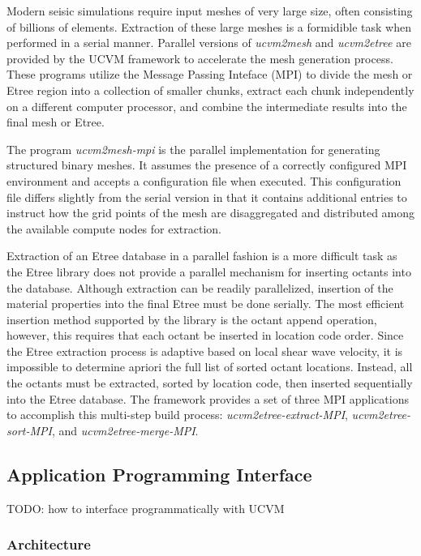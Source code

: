 Modern seisic simulations require input meshes of very large size, often consisting of billions of elements. Extraction of these large meshes is a formidible task when performed in a serial manner. Parallel versions of \emph{ucvm2mesh} and \emph{ucvm2etree} are provided by the UCVM framework to accelerate the mesh generation process. These programs utilize the Message Passing Inteface (MPI) to divide the mesh or Etree region into a collection of smaller chunks, extract each chunk independently on a different computer processor, and combine the intermediate results into the final mesh or Etree.

The program \emph{ucvm2mesh-mpi} is the parallel implementation for generating structured binary meshes. It assumes the presence of a correctly configured MPI environment and accepts a configuration file when executed. This configuration file differs slightly from the serial version in that it contains additional entries to instruct how the grid points of the mesh are disaggregated and distributed among the available compute nodes for extraction.

Extraction of an Etree database in a parallel fashion is a more difficult task as the Etree library does not provide a parallel mechanism for inserting octants into the database. Although extraction can be readily parallelized, insertion of the material properties into the final Etree must be done serially. The most efficient insertion method supported by the library is the octant append operation, however, this requires that each octant be inserted in location code order. Since the Etree extraction process is adaptive based on local shear wave velocity, it is impossible to determine apriori the full list of sorted octant locations. Instead, all the octants must be extracted, sorted by location code, then inserted sequentially into the Etree database. The framework provides a set of three MPI applications to accomplish this multi-step build process: \emph{ucvm2etree-extract-MPI}, \emph{ucvm2etree-sort-MPI}, and \emph{ucvm2etree-merge-MPI}.


\subsection{Application Programming Interface}

TODO: how to interface programmatically with UCVM

\subsubsection{Architecture}

